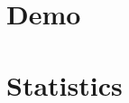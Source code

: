 \documentclass[10pt,twocolumn,letterpaper]{article}
\begin{document}
\section{Demo}\label{sec:analysis}




\appendix
\section{Statistics}\label{app:stats}

\end{document}
